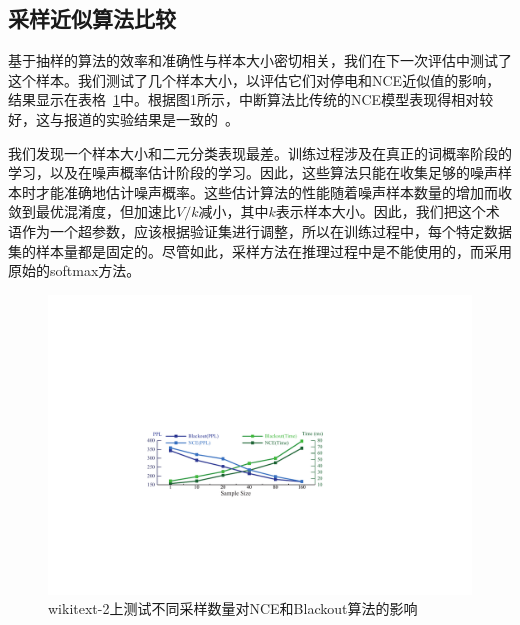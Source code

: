 \subsection{采样近似算法比较}

基于抽样的算法的效率和准确性与样本大小密切相关，我们在下一次评估中测试了这个样本。我们测试了几个样本大小，以评估它们对停电和NCE近似值的影响，结果显示在表格~\ref{fig:blackout_nce}中。根据图1所示，中断算法比传统的NCE模型表现得相对较好，这与报道的实验结果是一致的~\cite{DBLP:journals/iclr/JiVSAD15}。


我们发现一个样本大小和二元分类表现最差。训练过程涉及在真正的词概率阶段的学习，以及在噪声概率估计阶段的学习。因此，这些算法只能在收集足够的噪声样本时才能准确地估计噪声概率。这些估计算法的性能随着噪声样本数量的增加而收敛到最优混淆度，但加速比$ V / k $减小，其中$ k $表示样本大小。因此，我们把这个术语作为一个超参数，应该根据验证集进行调整，所以在训练过程中，每个特定数据集的样本量都是固定的。尽管如此，采样方法在推理过程中是不能使用的，而采用原始的softmax方法。
\begin{figure}[!ht]
  \centering
  \includegraphics[width=1\columnwidth]{./figures/nce_blackout.pdf}
  \caption{wikitext-2上测试不同采样数量对NCE和Blackout算法的影响}\label{fig:blackout_nce}
\end{figure}

